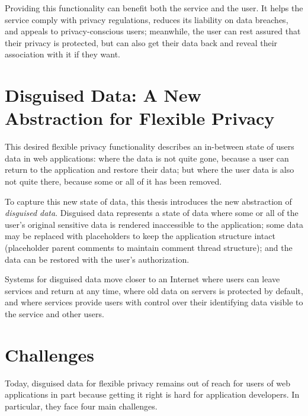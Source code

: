 %
Providing this functionality can benefit both the service and the user.
%
It helps the service comply with privacy regulations, reduces its liability on
data breaches, and appeals to privacy-conscious users; meanwhile, the user can
rest assured that their privacy is protected, but can also get their data back
and reveal their association with it if they want.


\section{Disguised Data: A New Abstraction for Flexible Privacy}
%
This desired flexible privacy functionality describes an in-between state of
users data in web applications: where the data is not quite gone, because a user
can return to the application and restore their data; but where the user data is
also not quite there, because some or all of it has been removed.
%

%
To capture this new state of data, this thesis introduces the new 
abstraction of \emph{disguised data}.  Disguised data represents a state of data
where \one{} some or all of the user's original sensitive data is rendered
inaccessible to the application; \two{} some data may be replaced with
placeholders to keep the application structure intact (\eg placeholder parent
comments to maintain comment thread structure); and \three{} the data can be
restored with the user's authorization.
%

%
Systems for disguised data move closer to an Internet where
users can leave services and return at any time, where old data on servers is
protected by default, and where services provide users with control over their
identifying data visible to the service and other users.
%

\section{Challenges} 
Today, disguised data for flexible privacy remains out of reach for users of
web applications in part because getting it right is hard for application
developers. In particular, they face four main challenges.

